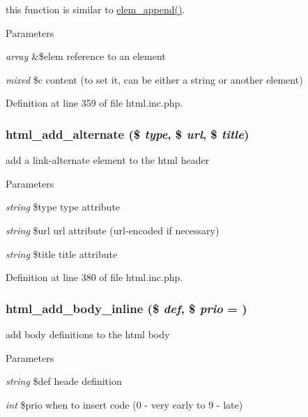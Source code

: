 this function is similar to \hyperlink{html_8inc_8php_aea37c451f5d55e2efbb2656e340c1dae}{elem\_\-append()}. 
\begin{DoxyParams}{Parameters}
\item[{\em array}]\&\$elem reference to an element \item[{\em mixed}]\$c content (to set it, can be either a string or another element) \end{DoxyParams}


Definition at line 359 of file html.inc.php.

\hypertarget{html_8inc_8php_ae013e8f0bdd681184ee1873a1964c454}{
\subsubsection[{html\_\-add\_\-alternate}]{\setlength{\rightskip}{0pt plus 5cm}html\_\-add\_\-alternate (\$ {\em type}, \/  \$ {\em url}, \/  \$ {\em title})}}
\label{html_8inc_8php_ae013e8f0bdd681184ee1873a1964c454}
add a link-\/alternate element to the html header


\begin{DoxyParams}{Parameters}
\item[{\em string}]\$type type attribute \item[{\em string}]\$url url attribute (url-\/encoded if necessary) \item[{\em string}]\$title title attribute \end{DoxyParams}


Definition at line 380 of file html.inc.php.

\hypertarget{html_8inc_8php_a2f59375f9b3aac2cf9ab8968cca33e17}{
\subsubsection[{html\_\-add\_\-body\_\-inline}]{\setlength{\rightskip}{0pt plus 5cm}html\_\-add\_\-body\_\-inline (\$ {\em def}, \/  \$ {\em prio} = {})}}
\label{html_8inc_8php_a2f59375f9b3aac2cf9ab8968cca33e17}
add body definitions to the html body


\begin{DoxyParams}{Parameters}
\item[{\em string}]\$def heade definition \item[{\em int}]\$prio when to insert code (0 -\/ very early to 9 -\/ late) \end{DoxyParams}



